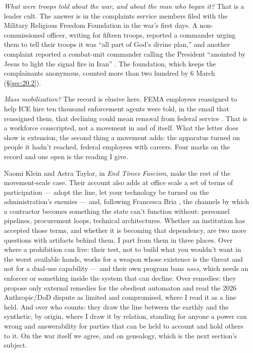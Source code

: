 \emph{What were troops told about the war, and about the man who began it?} That is a leader cult. The answer is in the complaints service members filed with the Military Religious Freedom Foundation in the war's first days. A non-commissioned officer, writing for fifteen troops, reported a commander urging them to tell their troops it was “all part of God's divine plan,” and another complaint reported a combat-unit commander calling the President “anointed by Jesus to light the signal fire in Iran” \autocite{Larsen2026Armageddon}. The foundation, which keeps the complainants anonymous, counted more than two hundred by 6 March \autocite{Snopes2026MRFF} (\S\ref{sec:20.2}).

\emph{Mass mobilization?} The record is elusive here. FEMA employees reassigned to help ICE hire ten thousand enforcement agents were told, in the email that reassigned them, that declining could mean removal from federal service \autocite{Dayen2025FEMAICE,Stanton2026FEMALetter}. That is a workforce conscripted, not a movement in and of itself. What the letter does show is extension, the second thing a movement adds: the apparatus turned on people it hadn't reached, federal employees with careers. Four marks on the record and one open is the reading I give.

Naomi Klein and Astra Taylor, in \emph{End Times Fascism}, make the rest of the movement-scale case. Their account also adds at office scale a set of terms of participation — adopt the line, let your technology be turned on the administration's enemies — and, following Francesca Bria \autocite{Bria2026AuthoritarianStack}, the channels by which a contractor becomes something the state can't function without: personnel pipelines, procurement loops, technical architectures. Whether an institution has accepted those terms, and whether it is becoming that dependency, are two more questions with artifacts behind them. I part from them in three places. Over where a prohibition can live: their test, not to build what you wouldn't want in the worst available hands, works for a weapon whose existence is the threat and not for a dual-use capability — and their own program bans \emph{uses}, which needs an enforcer or something inside the system that can decline. Over remedies: they propose only external remedies for the obedient automaton and read the 2026 Anthropic/DoD dispute as limited and compromised, where I read it as a line held. And over who counts: they draw the line between the earthly and the synthetic, by origin, where I draw it by relation, standing for anyone a power can wrong and answerability for parties that can be held to account and hold others to it. On the war itself we agree, and on genealogy, which is the next section's subject.
